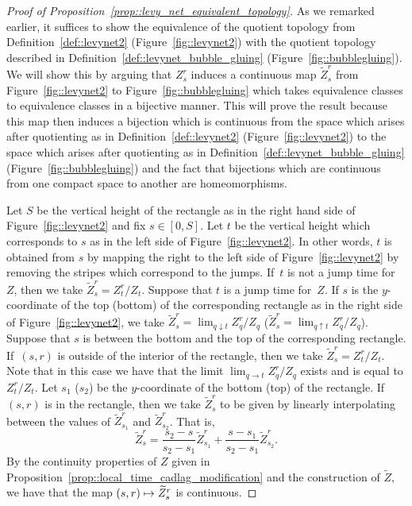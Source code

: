 \documentclass[10pt]{amsart}
\newcommand\mto{\mathchoice{\longmapsto}{\mapsto}{\mapsto}{\mapsto}}
\theoremstyle{plain}
\numberwithin{theorem}{section}
\theoremstyle{definition}
\let\wt\widetilde
\begin{document}
\begin{proof}[Proof of Proposition~\ref{prop::levy_net_equivalent_topology}]
As we remarked earlier, it suffices to show the equivalence of the quotient topology from Definition~\ref{def::levynet2} (Figure~\ref{fig::levynet2}) with the quotient topology described in Definition~\ref{def::levynet_bubble_gluing} (Figure~\ref{fig::bubblegluing}). We will show this by arguing that $Z_s^r$ induces a continuous map $\wt{Z}_s^r$ from Figure~\ref{fig::levynet2} to Figure~\ref{fig::bubblegluing} which takes equivalence classes to equivalence classes in a bijective manner. This will prove the result because this map then induces a bijection which is continuous from the space which arises after quotienting as in Definition~\ref{def::levynet2} (Figure~\ref{fig::levynet2}) to the space which arises after quotienting as in Definition~\ref{def::levynet_bubble_gluing} (Figure~\ref{fig::bubblegluing}) and the fact that bijections which are continuous from one compact space to another are homeomorphisms.

Let $S$ be the vertical height of the rectangle as in the right hand side of Figure~\ref{fig::levynet2} and fix $s \in [0,S]$. Let $t$ be the vertical height which corresponds to $s$ as in the left side of Figure~\ref{fig::levynet2}. In other words, $t$ is obtained from $s$ by mapping the right to the left side of Figure~\ref{fig::levynet2} by removing the stripes which correspond to the jumps. If~$t$ is not a jump time for~$Z$, then we take $\wt{Z}_s^r = Z_t^r / Z_t$. Suppose that $t$ is a jump time for~$Z$. If $s$ is the $y$-coordinate of the top (\resp bottom) of the corresponding rectangle as in the right side of Figure~\ref{fig::levynet2}, we take $\wt{Z}_s^r = \lim_{q \downarrow t} Z_q^r / Z_q$ (\resp $\wt{Z}_s^r = \lim_{q \uparrow t} Z_q^r / Z_q$). Suppose that $s$ is between the bottom and the top of the corresponding rectangle. If~$(s,r)$ is outside of the interior of the rectangle, then we take $\wt{Z}_s^r = Z_t^r / Z_t$. Note that in this case we have that the limit $\lim_{q \to t} Z_q^r / Z_q$ exists and is equal to $Z_t^r / Z_t$. Let $s_1$ (\resp $s_2$) be the $y$-coordinate of the bottom (\resp top) of the rectangle. If $(s,r)$ is in the rectangle, then we take $\wt{Z}_s^r$ to be given by linearly interpolating between the values of $\wt{Z}_{s_1}^r$ and $\wt{Z}_{s_2}^r$. That is,
\[
\wt{Z}_s^r = \frac{s_2-s}{s_2-s_1} \wt{Z}_{s_1}^r + \frac{s-s_1}{s_2-s_1} \wt{Z}_{s_2}^r.
\]
By the continuity properties of $Z$ given in Proposition~\ref{prop::local_time_cadlag_modification} and the construction of $\wt{Z}$, we have that the map $(s,r) \mto \wt{Z}_s^r$ is continuous.


\end{proof}
\end{document}
